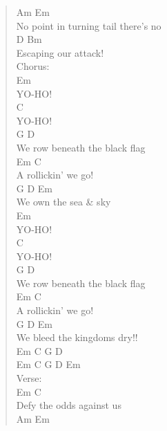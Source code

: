 \documentclass[11pt]{article}
\begin{document}
\begin{verse}
\hspace*{3em}Am               Em\\
No point in turning tail there's no\\
D             Bm\\
Escaping our attack!\\
\vspace*{1em}
Chorus:\\
\hspace*{3em}Em\\
YO-HO!\\
\hspace*{3em}C\\
YO-HO!\\
\hspace*{3em}G               D\\
We row beneath the black flag\\
\hspace*{5em}Em         C\\
A rollickin' we go!\\
\hspace*{3em}G       D     Em\\
We own the sea \& sky\\
\vspace*{1em}
\hspace*{3em}Em\\
YO-HO!\\
\hspace*{3em}C\\
YO-HO!\\
\hspace*{3em}G               D\\
We row beneath the black flag\\
\hspace*{5em}Em         C\\
A rollickin' we go!\\
\hspace*{3em}G         D        Em\\
We bleed the kingdoms dry!!\\
\vspace*{1em}
Em   C   G   D\\
Em   C   G D Em\\
\vspace*{1em}
Verse:\\
\hspace*{2em}Em           C\\
Defy the odds against us\\
\hspace*{2em}Am              Em\\

\end{verse}
\end{document}
